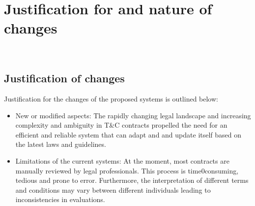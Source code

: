 \chapter{Justification for and nature of changes \\
\label{Chapter::Justification for and nature of changes}}\



\section{Justification of changes  \label{Section::Justification of changes} }
Justification for the changes of the proposed systems is outlined below: 
\begin{itemize}
    \item New or modified aspects: The rapidly changing legal landscape and increasing complexity and ambiguity in T\&C contracts propelled the need for an efficient and reliable system that can adapt and and update itself based on the latest laws and guidelines. 
    \item Limitations of the current systems: At the moment, most contracts are manually reviewed by legal professionals. This process is time0consuming, tedious and prone to error. Furthermore, the interpretation of different terms and conditions may vary between different individuals leading to inconsistencies in evaluations. 


\end{itemize}
